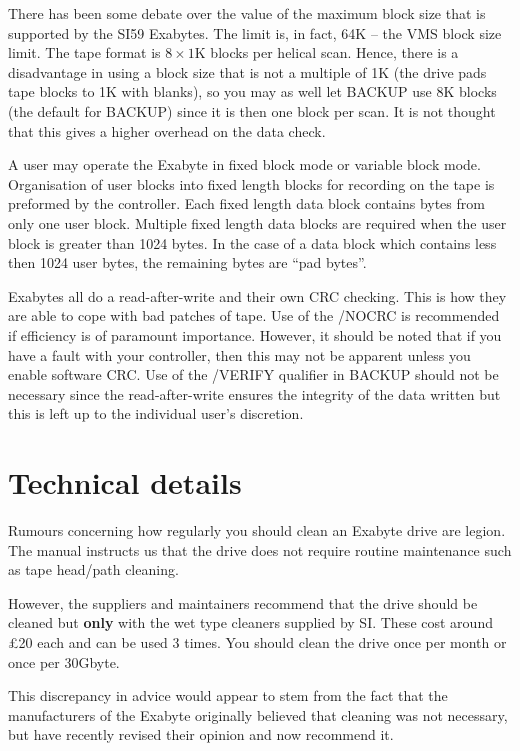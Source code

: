 There has been some debate over the value of the maximum block size  that is
supported by the SI59 Exabytes. The limit is, in fact, 64K -- the VMS block size
limit. The tape format is $8 \times 1$K blocks
per helical scan. Hence, there is a disadvantage in using a block size that is not
a multiple of 1K (the drive pads tape blocks to 1K with blanks), so you may as well
let BACKUP use 8K blocks (the default for BACKUP) since it is then one block per
scan. It is not thought that this gives a higher overhead on the data check.

A user may operate the Exabyte in fixed block mode or variable block mode.
Organisation of user blocks into fixed length blocks for recording on the tape
is preformed by the controller. Each fixed length data block contains bytes
from only one user block. Multiple fixed length data blocks are required
when the user block is greater than 1024 bytes. In the case of a data block
which contains less then 1024 user bytes, the remaining bytes are
``pad bytes''.

Exabytes all do a read-after-write and their own CRC checking. This is how
they are able to cope with bad patches of tape. Use of the /NOCRC is
recommended if efficiency is of paramount importance. However, it should be
noted that if you have a fault with your controller, then this may not be
apparent unless you enable software CRC.
Use of the /VERIFY qualifier in BACKUP should not be
necessary since the read-after-write ensures the integrity of the data
written but this is left up to the individual user's discretion.

\section{ Technical details}

Rumours concerning how regularly you should clean an Exabyte drive are legion.
The manual instructs us that the drive does not require routine maintenance
such as tape head/path cleaning.

However, the suppliers and maintainers recommend that the drive should be
cleaned but {\bf only} with the wet type cleaners supplied by SI. These cost
around \pounds 20 each and can be used 3 times. You should clean the drive once
per month or once per 30Gbyte.

This discrepancy in advice would appear to stem from the fact that the manufacturers of
the Exabyte originally believed that cleaning was not necessary, but have
recently revised their opinion and now recommend it.

